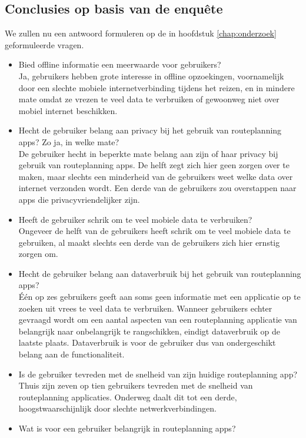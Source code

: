 \subsection{Conclusies op basis van de enquête}
We zullen nu een antwoord formuleren op de in hoofdstuk \ref{chap:onderzoek} geformuleerde vragen.
\begin{itemize}
	\item Bied offline informatie een meerwaarde voor gebruikers?\\
	Ja, gebruikers hebben grote interesse in offline opzoekingen, voornamelijk door een slechte mobiele internetverbinding tijdens het reizen, en in mindere mate omdat ze vrezen te veel data te verbruiken of gewoonweg niet over mobiel internet beschikken.
	\item Hecht de gebruiker belang aan privacy bij het gebruik van routeplanning apps? Zo ja, in welke mate?\\
	De gebruiker hecht in beperkte mate belang aan zijn of haar privacy bij gebruik van routeplanning apps. De helft zegt zich hier geen zorgen over te maken, maar slechts een minderheid van de gebruikers weet welke data over internet verzonden wordt. Een derde van de gebruikers zou overstappen naar apps die privacyvriendelijker zijn.
	\item Heeft de gebruiker schrik om te veel mobiele data te verbruiken?\\
	Ongeveer de helft van de gebruikers heeft schrik om te veel mobiele data te gebruiken, al maakt slechts een derde van de gebruikers zich hier ernstig zorgen om.
	\item Hecht de gebruiker belang aan dataverbruik bij het gebruik van routeplanning apps?\\
	Één op zes gebruikers geeft aan soms geen informatie met een applicatie op te zoeken uit vrees te veel data te verbruiken. Wanneer gebruikers echter gevraagd wordt om een aantal aspecten van een routeplanning applicatie van belangrijk naar onbelangrijk te rangschikken, eindigt dataverbruik op de laatste plaats. Dataverbruik is voor de gebruiker dus van ondergeschikt belang aan de functionaliteit.
	\item Is de gebruiker tevreden met de snelheid van zijn huidige routeplanning app?\\
	Thuis zijn zeven op tien gebruikers tevreden met de snelheid van routeplanning applicaties. Onderweg daalt dit tot een derde, hoogstwaarschijnlijk door slechte netwerkverbindingen.
	\item Wat is voor een gebruiker belangrijk in routeplanning apps?\\

\end{itemize}
